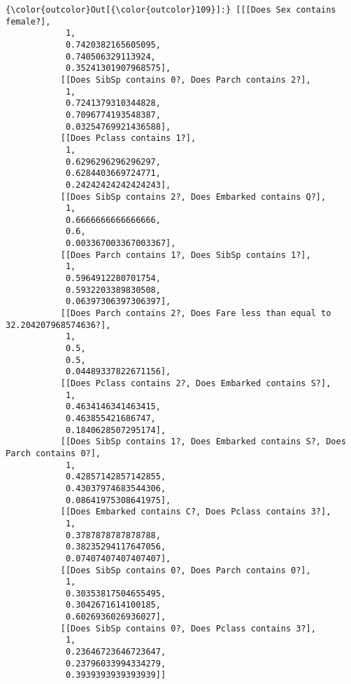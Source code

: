 \documentclass[11pt]{article}
\begin{document}
\begin{Verbatim}[commandchars=\\\{\}]
{\color{outcolor}Out[{\color{outcolor}109}]:} [[[Does Sex contains female?],
            1,
            0.7420382165605095,
            0.740506329113924,
            0.35241301907968575],
           [[Does SibSp contains 0?, Does Parch contains 2?],
            1,
            0.7241379310344828,
            0.7096774193548387,
            0.03254769921436588],
           [[Does Pclass contains 1?],
            1,
            0.6296296296296297,
            0.6284403669724771,
            0.24242424242424243],
           [[Does SibSp contains 2?, Does Embarked contains Q?],
            1,
            0.6666666666666666,
            0.6,
            0.003367003367003367],
           [[Does Parch contains 1?, Does SibSp contains 1?],
            1,
            0.5964912280701754,
            0.5932203389830508,
            0.06397306397306397],
           [[Does Parch contains 2?, Does Fare less than equal to 32.204207968574636?],
            1,
            0.5,
            0.5,
            0.04489337822671156],
           [[Does Pclass contains 2?, Does Embarked contains S?],
            1,
            0.4634146341463415,
            0.463855421686747,
            0.1840628507295174],
           [[Does SibSp contains 1?, Does Embarked contains S?, Does Parch contains 0?],
            1,
            0.42857142857142855,
            0.43037974683544306,
            0.08641975308641975],
           [[Does Embarked contains C?, Does Pclass contains 3?],
            1,
            0.3787878787878788,
            0.38235294117647056,
            0.07407407407407407],
           [[Does SibSp contains 0?, Does Parch contains 0?],
            1,
            0.30353817504655495,
            0.3042671614100185,
            0.6026936026936027],
           [[Does SibSp contains 0?, Does Pclass contains 3?],
            1,
            0.23646723646723647,
            0.23796033994334279,
            0.3939393939393939]]
\end{Verbatim}
            

    
    
    
    
\end{document}
